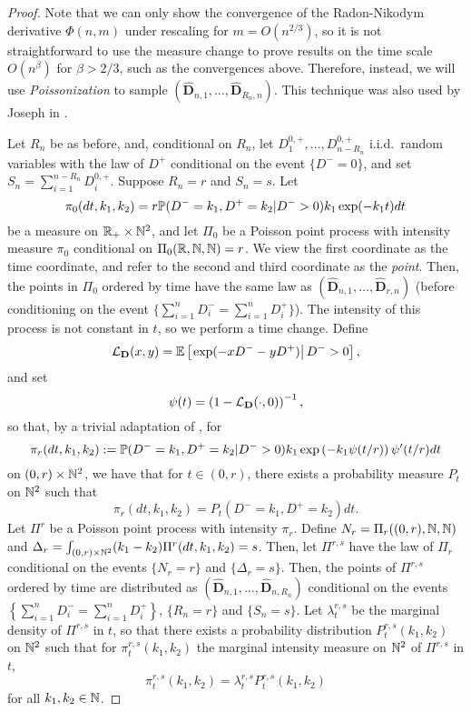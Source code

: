 \begin{proof}
Note that we can only show the convergence of the Radon-Nikodym derivative $\Phi(n,m)$ under rescaling for $m=O(n^{2/3})$, so it is not straightforward to use the measure change to prove results on the time scale $O(n^\beta)$ for $\beta>2/3$, such as the convergences above. Therefore, instead, we will use \emph{Poissonization} to sample $(\mathbf{\hat{D}}_{n,1},\dots,\mathbf{\hat{D}}_{R_n,n})$. This technique was also used by Joseph in \cite{josephComponentSizesCritical2014}. 

 Let $R_n$ be as before, and, conditional on $R_n$, let $D^{0,+}_1,\dots,D^{0,+}_{n-R_n}$ i.i.d.\ random variables with the law of $D^+$ conditional on the event $\{D^-=0\}$, and set $S_n=\sum_{i=1}^{n-R_n}D^{0,+}_i$. Suppose $R_n=r$ and $S_n=s$. 
Let
$$\pi_0(dt,k_1,k_2)=r\P(D^-=k_1,D^+=k_2|D^->0)k_1\exp(-k_1 t)dt$$
be a measure on $\R_+\times \N^2$, and let $\Pi_0$ be a Poisson point process with intensity measure $\pi_0$ conditional on $\Pi_0(\R,\N,\N)=r$. We view the first coordinate as the time coordinate, and refer to the second and third coordinate as the \emph{point}. Then, the points in $\Pi_0$ ordered by time have the same law as $(\mathbf{\hat{D}}_{n,1},\dots,\mathbf{\hat{D}}_{r,n})$ (before conditioning on the event $\{\sum_{i=1}^nD^-_i=\sum_{i=1}^nD^+_i\}$).  
The intensity of this process is not constant in $t$, so we perform a time change. Define
$$\cL_{\mathbf{D}}(x,y)=\E\left[\left.\exp(-xD^--yD^+)\right|D^->0 \right],$$
and set 
$$\psi(t)=\left(1-\cL_{\mathbf{D}}(\cdot,0)\right)^{-1},$$
so that, by a trivial adaptation of \cite[Lemma 4.1]{josephComponentSizesCritical2014}, for 
$$\pi_r(dt,k_1,k_2):=\P(D^-=k_1,D^+=k_2|D^->0)k_1\exp\left(-k_1 \psi(t/r)\right)\psi'(t/r)dt$$
on $(0,r)\times \N^2$, we have that for $t\in (0,r)$, there exists a probability measure $P_t$ on $\N^2$ such that
$$\pi_r(dt,k_1,k_2)=P_t(D^-=k_1,D^+=k_2)dt.$$
Let ${\Pi}^r$ be a Poisson point process with intensity $\pi_r$. Define $N_r= {\Pi}_r((0,r),\N,\N)$ and $\Delta_r=\int_{(0,r)\times \N^2}(k_1-k_2){\Pi}^r(dt,k_1,k_2)=s$. Then, let ${\Pi}^{r,s}$ have the law of ${\Pi}_r$ conditional on the events $\{N_r=r\}$ and $\{\Delta_r=s\}$. Then, the points of ${\Pi}^{r,s}$ ordered by time are distributed as $(\mathbf{\hat{D}}_{n,1},\dots,\mathbf{\hat{D}}_{n,R_n})$ conditional on the events $\left\{\sum_{i=1}^nD^-_i=\sum_{i=1}^nD^+_i\right\}$, $\{R_n=r\}$ and $\{S_n=s\}$. Let ${\lambda}^{r,s}_t$ be the marginal density of ${\Pi}^{r,s}$ in $t$, so that there exists a probability distribution ${P}^{r,s}_t(k_1,k_2)$ on $\N^2$ such that for ${\pi}^{r,s}_t(k_1,k_2)$ the marginal intensity measure on $\N^2$ of ${\Pi}^{r,s}$ in $t$, 
$${\pi}^{r,s}_t(k_1,k_2)={\lambda}^{r,s}_t{P}^{r,s}_t(k_1,k_2)$$
for all $k_1,k_2\in \N$.


\end{proof}
